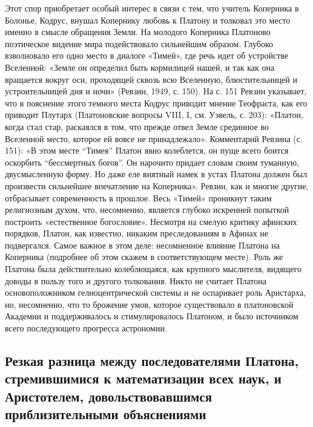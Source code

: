 Этот спор приобретает особый интерес в связи с тем, что учитель
Коперника в Болонье, Кодрус, внушал Копернику любовь к Платону и
толковал это место именно в смысле обращения Земли. На молодого
Коперника Платоново поэтическое видение мира подействовало сильнейшим
образом. Глубоко взволновало его одно место в диалоге «Тимей», где
речь идет об устройстве Вселенной: «Земле он определил быть кормилицей
нашей, и так как она вращается вокруг оси, проходящей сквозь всю
Вселенную, блюстительницей и устроительницей дня и ночи» (Ревзин,
1949, с. 150). На с. 151 Ревзин указывает, что в пояснение этого
темного места Кодрус приводит мнение Теофраста, как его приводит
Плутарх (Платоновские вопросы VIII, I, см. Уэвель, с. 203): «Платон,
когда стал стар, раскаялся в том, что прежде отвел Земле срединное во
Вселенной место, которое ей вовсе не принадлежало». Комментарий
Ревзина (с. 151): «В этом месте ``Тимея'' Платон явно колеблется, он
пуще всего боится оскорбить ``бессмертных богов''. Он нарочито придает
словам своим туманную, двусмысленную форму. Но даже еле внятный намек
в устах Платона должен был произвести сильнейшее впечатление на
Коперника». Ревзин, как и многие другие, отбрасывает современность в
прошлое. Весь «Тимей» проникнут таким религиозным духом, что,
несомненно, является глубоко искренней попыткой построить
«естественное богословие». Несмотря на смелую критику афинских
порядков, Платон, как известно, никаким преследованиям в Афинах не
подвергался. Самое важное в этом деле: несомненное влияние Платона на
Коперника (подробнее об этом скажем в соответствующем месте). Роль же
Платона была действительно колеблющаяся, как крупного мыслителя,
видящего доводы в пользу того и другого толкования. Никто не считает
Платона основоположником гелиоцентрической системы и не оспаривает
роль Аристарха, но, несомненно, что то брожение умов, которое
существовало в платоновской Академии и поддерживалось и
стимулировалось Платоном, и было источником всего последующего
прогресса астрономии.

\subsection{Резкая разница между последователями Платона,
стремившимися к математизации всех наук, и Аристотелем,
довольствовавшимся приблизительными объяснениями}

